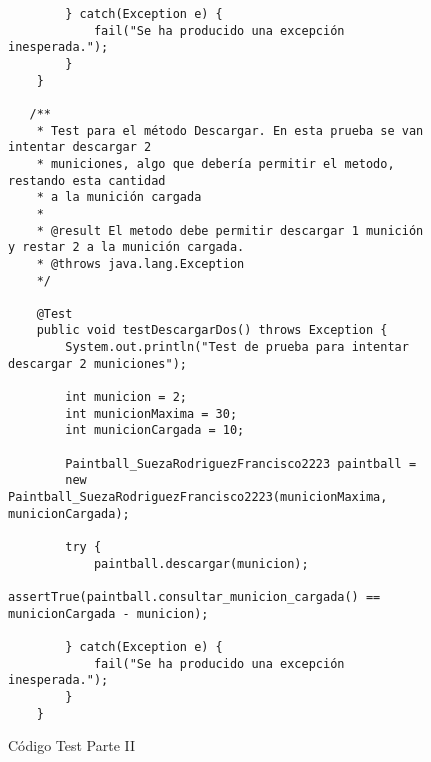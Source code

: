 \begin{figure}[H]
\begin{tcolorbox}[sharp corners, colback=yellow!30, colframe=white!20]
\begin{verbatim}
        } catch(Exception e) {
            fail("Se ha producido una excepción inesperada.");
        }
    }

   /**
    * Test para el método Descargar. En esta prueba se van intentar descargar 2
    * municiones, algo que debería permitir el metodo, restando esta cantidad
    * a la munición cargada
    *
    * @result El metodo debe permitir descargar 1 munición y restar 2 a la munición cargada.
    * @throws java.lang.Exception
    */

    @Test
    public void testDescargarDos() throws Exception {
        System.out.println("Test de prueba para intentar descargar 2 municiones");

        int municion = 2;
        int municionMaxima = 30;
        int municionCargada = 10;

        Paintball_SuezaRodriguezFrancisco2223 paintball =
        new Paintball_SuezaRodriguezFrancisco2223(municionMaxima, municionCargada);

        try {
            paintball.descargar(municion);
            assertTrue(paintball.consultar_municion_cargada() == municionCargada - municion);

        } catch(Exception e) {
            fail("Se ha producido una excepción inesperada.");
        }
    }

        \end{verbatim}
    \end{tcolorbox}
    \caption{Código Test Parte II}
\end{figure}

